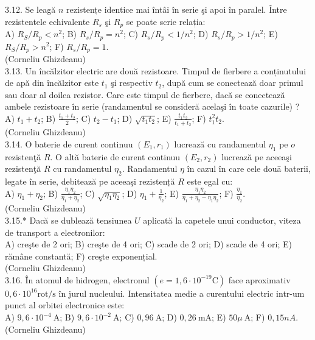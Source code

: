 \documentclass[10pt]{article}
\begin{document}
3.12. Se leagă $n$ rezistențe identice mai întâi în serie şi apoi în paralel. Între rezistentele echivalente $R_{s}$ şi $R_{p}$ se poate scrie relația:\\ A) $R_{S} / R_{p}<n^{2}$; B) $R_{s} / R_{p}=n^{2}$; C) $R_{s} / R_{p}<1 / n^{2}$; D) $R_{s} / R_{p}>1 / n^{2}$; E) $R_{S} / R_{p}>n^{2}$; F) $R_{s} / R_{p}=1$.\\ (Corneliu Ghizdeanu)\\

3.13. Un încălzitor electric are două rezistoare. Timpul de fierbere a conținutului de apă din încălzitor este $t_{1}$ şi respectiv $t_{2}$, după cum se conectează doar primul sau doar al doilea rezistor. Care este timpul de fierbere, dacă se conectează ambele rezistoare în serie (randamentul se consideră acelaşi în toate cazurile) ?\\ A) $t_{1}+t_{2}$; B) $\frac{t_{1}+t_{2}}{2}$; C) $t_{2}-t_{1}$; D) $\sqrt{t_{1} t_{2}}$; E) $\frac{t_{1} t_{2}}{t_{1}+t_{2}}$; F) $t_{1}^{2} t_{2}$.\\ (Corneliu Ghizdeanu)\\

3.14. O baterie de curent continuu $\left(E_{1}, r_{1}\right)$ lucrează cu randamentul $\eta_{1}$ pe $o$ rezistenţă $R$. O altă baterie de curent continuu $\left(E_{2}, r_{2}\right)$ lucrează pe aceeaşi rezistenţă $R$ cu randamentul $\eta_{2}$. Randamentul $\eta$ în cazul în care cele douā baterii, legate în serie, debitează pe aceeaşi rezistență $R$ este egal cu:\\ A) $\eta_{1}+\eta_{2}$; B) $\frac{\eta_{1} \eta_{2}}{\eta_{1}+\eta_{2}}$; C) $\sqrt{\eta_{1} \eta_{2}}$; D) $\eta_{1}+\frac{1}{\eta_{2}}$; E) $\frac{\eta_{1} \eta_{2}}{\eta_{1}+\eta_{2}-\eta_{1} \eta_{2}}$; F) $\frac{\eta_{1}}{\eta_{2}}$.\\ (Corneliu Ghizdeanu)\\

3.15.* Dacă se dublează tensiunea $U$ aplicată la capetele unui conductor, viteza de transport a electronilor:\\ A) creşte de 2 ori; B) creşte de 4 ori; C) scade de 2 ori; D) scade de 4 ori; E) rămâne constantă; F) creşte exponențial.\\ (Corneliu Ghizdeanu)\\

3.16. În atomul de hidrogen, electronul $\left(e=1,6 \cdot 10^{-19} \mathrm{C}\right)$ face aproximativ $0,6 \cdot 10^{16} \mathrm{rot} / \mathrm{s}$ în jurul nucleului. Intensitatea medie a curentului electric intr-um punct al orbitei electronice este:\\ A) $9,6 \cdot 10^{-4} \mathrm{~A}$; B) $9,6 \cdot 10^{-2} \mathrm{~A}$; C) $0,96 \mathrm{~A}$; D) $0,26 \mathrm{~mA}$; E) $50 \mu \mathrm{~A}$; F) $0,15 n A$.\\ (Corneliu Ghizdeanu)\\
\end{document}

